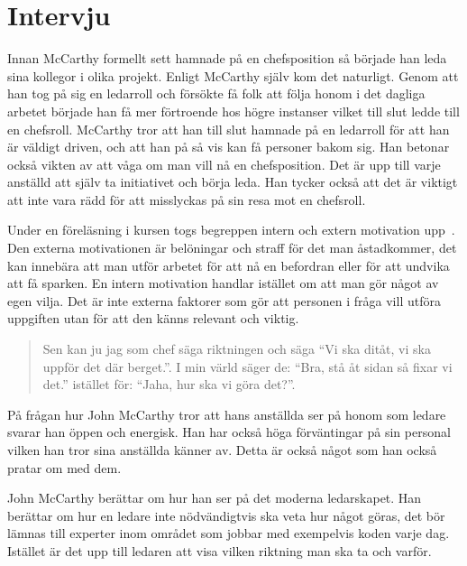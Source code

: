 \section{Intervju}
\label{sec:intervju}

Innan McCarthy formellt sett hamnade på en chefsposition så började han leda sina kollegor i olika projekt. Enligt McCarthy själv kom det naturligt. Genom att han tog på sig en ledarroll och försökte få folk att följa honom i det dagliga arbetet började han få mer förtroende hos högre instanser vilket till slut ledde till en chefsroll. McCarthy tror att han till slut hamnade på en ledarroll för att han är väldigt driven, och att han på så vis kan få personer bakom sig. Han betonar också vikten av att våga om man vill nå en chefsposition. Det är upp till varje anställd att själv ta initiativet och börja leda. Han tycker också att det är viktigt att inte vara rädd för att misslyckas på sin resa mot en chefsroll.

Under en föreläsning i kursen togs begreppen intern och extern motivation upp~\citep{motivation}. Den externa motivationen är belöningar och straff för det man åstadkommer, det kan innebära att man utför arbetet för att nå en befordran eller för att undvika att få sparken. En intern motivation handlar istället om att man gör något av egen vilja. Det är inte externa faktorer som gör att personen i fråga vill utföra uppgiften utan för att den känns relevant och viktig.

\begin{quote}
 Sen kan ju jag som chef säga riktningen och säga ``Vi ska ditåt, vi ska uppför det där berget.''. I min värld säger de: ``Bra, stå åt sidan så fixar vi det.'' istället för: ``Jaha, hur ska vi göra det?''.
\end{quote}

På frågan hur John McCarthy tror att hans anställda ser på honom som ledare svarar han öppen och energisk. Han har också höga förväntingar på sin personal vilken han tror sina anställda känner av. Detta är också något som han också pratar om med dem.

John McCarthy berättar om hur han ser på det moderna ledarskapet. Han berättar om hur en ledare inte nödvändigtvis ska veta hur något göras, det bör lämnas till experter inom området som jobbar med exempelvis koden varje dag. Istället är det upp till ledaren att  visa vilken riktning man ska ta och varför.

